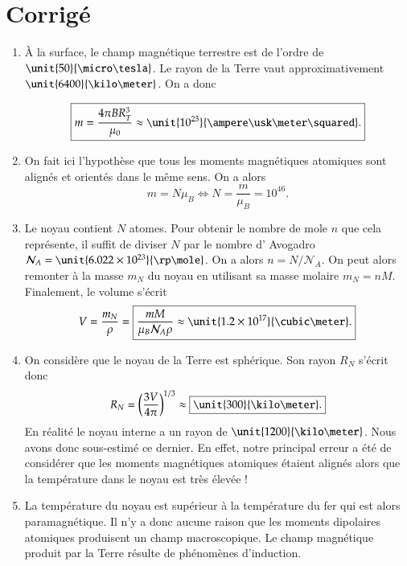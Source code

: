\section{Corrigé}
\begin{corrige}
\begin{enumerate}
	\item À la surface, le champ magnétique terrestre est de l'ordre de
	  $\unit{50}{\micro \tesla}$. Le rayon de la Terre vaut approximativement
	  $\unit{6400}{\kilo \meter}$. On a donc
	  
	  \begin{equation*}
		  \boxed{ m = \dfrac{4 \pi B R_T^3}{\mu_0} \approx \unit{10^{23}}{\ampere
		  \usk \meter \squared}.} 
	  \end{equation*}

	 \item On fait ici l'hypothèse que tous les moments magnétiques atomiques
	   sont alignés et orientés dans le même sens. On a alors
	   \begin{equation*}
		   m = N\mu_B \iff \boxed{N = \dfrac{m}{\mu_B} = 10^{46}.}
	   \end{equation*}

	 \item Le noyau contient $N$ atomes. Pour obtenir le nombre de mole 
	   $n$ que cela représente, il suffit de diviser $N$ par le nombre d'
	   Avogadro $\mathcal{N}_A = \unit{6.022 \times 10^{23}}{\rp \mole}$.
	   On a alors $n = N/\mathcal{N}_A$. On peut alors remonter à la masse 
	   $m_N$ du noyau en utilisant sa masse molaire $m_N = nM$. Finalement,
	   le volume s'écrit
	   \begin{equation*}
		   V = \dfrac{m_N}{\rho} = \boxed{\dfrac{mM}{\mu_B \mathcal{N}_A \rho}
	   \approx \unit{1.2 \times 10^{17}}{\cubic \meter}.}
	   \end{equation*}

   \item On considère que le noyau de la Terre est sphérique. Son rayon $R_N$ 
     s'écrit donc
     \begin{equation*}
	     R_N = \left(\dfrac{3V}{4\pi}\right)^{1/3} \approx 
	     \boxed{\unit{300}{\kilo \meter}.}
     \end{equation*}
     En réalité le noyau interne a un rayon de $\unit{1200}{\kilo \meter}$. Nous 
     avons donc sous-estimé ce dernier. En effet, notre principal erreur a été 
     de considérer que les moments magnétiques atomiques étaient alignés
     alors que la température dans le noyau est très élevée !
  \item La température du noyau est supérieur à la température du fer qui est alors
    paramagnétique. Il n'y a donc aucune raison que les moments dipolaires atomiques
    produisent un champ macroscopique. Le champ magnétique produit par la
    Terre résulte de phénomènes d'induction.
\end{enumerate}
\end{corrige}

